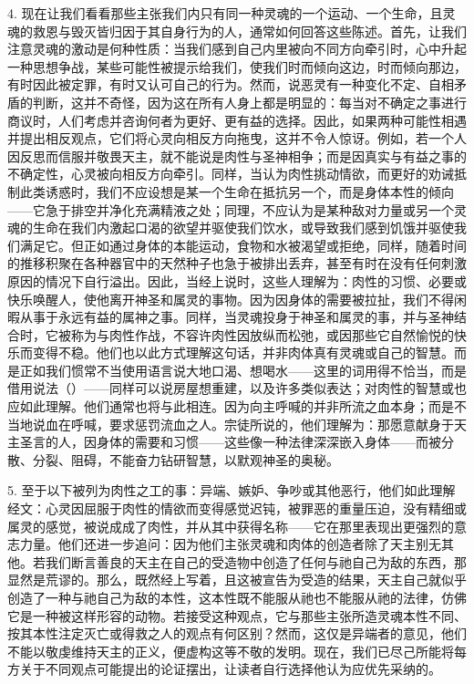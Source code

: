 4. 现在让我们看看那些主张我们内只有同一种灵魂的一个运动、一个生命，且灵魂的救恩与毁灭皆归因于其自身行为的人，通常如何回答这些陈述。首先，让我们注意灵魂的激动是何种性质：当我们感到自己内里被向不同方向牵引时，心中升起一种思想争战，某些可能性被提示给我们，使我们时而倾向这边，时而倾向那边，有时因此被定罪，有时又认可自己的行为。然而，说恶灵有一种变化不定、自相矛盾的判断，这并不奇怪，因为这在所有人身上都是明显的：每当对不确定之事进行商议时，人们考虑并咨询何者为更好、更有益的选择。因此，如果两种可能性相遇并提出相反观点，它们将心灵向相反方向拖曳，这并不令人惊讶。例如，若一个人因反思而信服并敬畏天主，就不能说是肉性与圣神相争；而是因真实与有益之事的不确定性，心灵被向相反方向牵引。同样，当认为肉性挑动情欲，而更好的劝诫抵制此类诱惑时，我们不应设想是某一个生命在抵抗另一个，而是身体本性的倾向——它急于排空并净化充满精液之处；同理，不应认为是某种敌对力量或另一个灵魂的生命在我们内激起口渴的欲望并驱使我们饮水，或导致我们感到饥饿并驱使我们满足它。但正如通过身体的本能运动，食物和水被渴望或拒绝，同样，随着时间的推移积聚在各种器官中的天然种子也急于被排出丢弃，甚至有时在没有任何刺激原因的情况下自行溢出。因此，当经上说时，这些人理解为：肉性的习惯、必要或快乐唤醒人，使他离开神圣和属灵的事物。因为因身体的需要被拉扯，我们不得闲暇从事于永远有益的属神之事。同样，当灵魂投身于神圣和属灵的事，并与圣神结合时，它被称为与肉性作战，不容许肉性因放纵而松弛，或因那些它自然愉悦的快乐而变得不稳。他们也以此方式理解这句话，并非肉体真有灵魂或自己的智慧。而是正如我们惯常不当使用语言说大地口渴、想喝水——这里的词用得不恰当，而是借用说法（）——同样可以说房屋想重建，以及许多类似表达；对肉性的智慧或也应如此理解。他们通常也将与此相连。因为向主呼喊的并非所流之血本身；而是不当地说血在呼喊，要求惩罚流血之人。宗徒所说的，他们理解为：那愿意献身于天主圣言的人，因身体的需要和习惯——这些像一种法律深深嵌入身体——而被分散、分裂、阻碍，不能奋力钻研智慧，以默观神圣的奥秘。\par

5. 至于以下被列为肉性之工的事：异端、嫉妒、争吵或其他恶行，他们如此理解经文：心灵因屈服于肉性的情欲而变得感觉迟钝，被罪恶的重量压迫，没有精细或属灵的感觉，被说成成了肉性，并从其中获得名称——它在那里表现出更强烈的意志力量。他们还进一步追问：因为他们主张灵魂和肉体的创造者除了天主别无其他。若我们断言善良的天主在自己的受造物中创造了任何与祂自己为敌的东西，那显然是荒谬的。那么，既然经上写着，且这被宣告为受造的结果，天主自己就似乎创造了一种与祂自己为敌的本性，这本性既不能服从祂也不能服从祂的法律，仿佛它是一种被这样形容的动物。若接受这种观点，它与那些主张所造灵魂本性不同、按其本性注定灭亡或得救之人的观点有何区别？然而，这仅是异端者的意见，他们不能以敬虔维持天主的正义，便虚构这等不敬的发明。现在，我们已尽己所能将每方关于不同观点可能提出的论证摆出，让读者自行选择他认为应优先采纳的。\par

